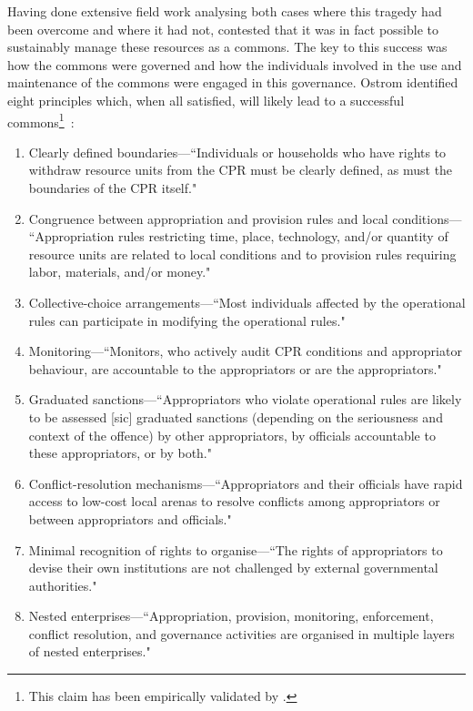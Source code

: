 Having done extensive field work analysing both cases where this tragedy had been overcome and where it had not, \citet{Ostrom1990} contested that it was in fact possible to sustainably manage these resources as a commons.
The key to this success was  how the commons were governed and how the individuals involved in the use and maintenance of the commons were engaged in this governance. 
Ostrom identified eight principles which, when all satisfied, will likely lead to a successful commons\footnote{This claim has been empirically validated by \citet{cox2010review}.}~\cite[pp.\ 91-101]{Ostrom1990}:
\begin{enumerate}
\item Clearly defined boundaries---``Individuals or households who have rights to withdraw resource units from the \ac{CPR} must be clearly defined, as must the boundaries of the \ac{CPR} itself."
\item Congruence between appropriation and provision rules and local cond\-itions--- ``Appropriation rules restricting time, place, technology, and/or quantity of resource units are related to local conditions and to provision rules requiring labor, materials, and/or money."
\item Collective-choice arrangements---``Most individuals affected by the operational rules can participate in modifying the operational rules."
\item Monitoring---``Monitors, who actively audit \ac{CPR} conditions and appropriator behaviour, are accountable to the appropriators or are the appropriators."
\item Graduated sanctions---``Appropriators who violate operational rules are likely to be assessed [sic] graduated sanctions (depending on the seriousness and context of the offence) by other appropriators, by officials accountable to these appropriators, or by both."
\item Conflict-resolution mechanisms---``Appropriators and their officials have rapid access to low-cost local arenas to resolve conflicts among appropriators or between appropriators and officials."
\item Minimal recognition of rights to organise---``The rights of appropriators to devise their own institutions are not challenged by external governmental authorities."
\item Nested enterprises---``Appropriation, provision, monitoring, enforcement, conflict resolution, and governance activities are organised in multiple layers of nested enterprises."
\end{enumerate}

